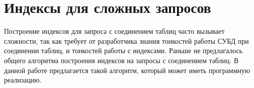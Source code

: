 \section{Индексы для сложных запросов}

Построение индексов для запроса с соединением таблиц часто вызывает сложности, так как требует от разработчика знания тонкостей работы СУБД при соединении таблиц, и тонкостей работы с индексами. Раньше не предлагалось общего алгоритма построения индексов на запросы с соединением таблиц. В данной работе предлагается такой алгоритм, который может иметь программную реализацию.